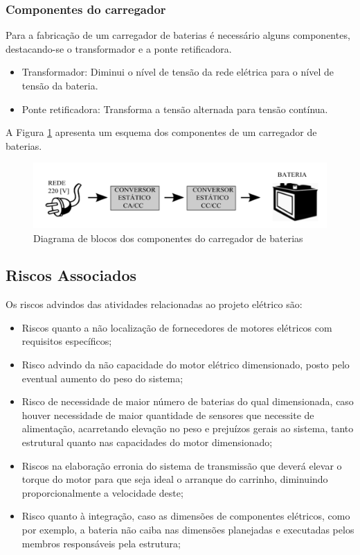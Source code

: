 \subsubsection{Componentes do carregador}
 \par Para a fabricação de um carregador de baterias é necessário alguns componentes, destacando-se o transformador e a ponte retificadora.
\begin{itemize}
\item Transformador: Diminui o nível de tensão da rede elétrica para o nível de tensão da bateria.
\item Ponte retificadora: Transforma a tensão alternada para tensão contínua. 

\end{itemize}
\par A Figura \ref{fig:diagrama_carregador} apresenta um esquema dos componentes de um carregador de baterias.  
\begin{figure}[ht]
		\centering
		\includegraphics[width=1\textwidth]{figuras/imagem.png}
		\caption{Diagrama de blocos dos componentes do carregador de baterias}
		\label{fig:diagrama_carregador}
\end{figure} 


\subsection{Riscos Associados}

Os riscos advindos das atividades relacionadas ao projeto elétrico são:

\begin{itemize}  
\item Riscos quanto a não localização de fornecedores de motores elétricos com requisitos específicos;
\item Risco advindo da não capacidade do motor elétrico dimensionado, posto pelo eventual aumento do peso do sistema;
\item Risco de necessidade de maior número de baterias do qual dimensionada, caso houver necessidade de maior quantidade de sensores que necessite de alimentação, acarretando elevação no peso e prejuízos gerais ao sistema, tanto estrutural quanto nas capacidades do motor dimensionado;
\item Riscos na elaboração erronia do sistema de transmissão que deverá elevar o torque do motor para que seja ideal o arranque do carrinho, diminuindo proporcionalmente a velocidade deste;
\item Risco quanto à integração, caso as dimensões de componentes elétricos, como por exemplo, a bateria não caiba nas dimensões planejadas e executadas pelos membros responsáveis pela estrutura;
\end{itemize}

